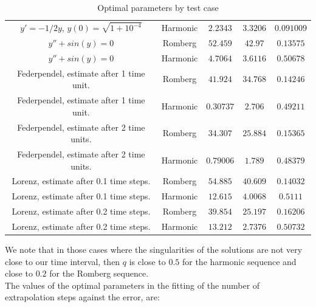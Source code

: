 \begin{table}[H]
\begin{tabular}{c|c||c|c|c}
$y' = -1/2y$, $y(0) = \sqrt{1+10^{-4}}$ & Harmonic & \(2.2343\) & \(3.3206\) & \(0.091009\)\\
$y'' + sin(y) = 0$ & Romberg & \(52.459\) & \(42.97\) & \(0.13575\)\\
$y'' + sin(y) = 0$ & Harmonic & \(4.7064\) & \(3.6116\) & \(0.50678\)\\
Federpendel, estimate after 1 time unit. & Romberg & \(41.924\) & \(34.768\) & \(0.14246\)\\
Federpendel, estimate after 1 time unit. & Harmonic & \(0.30737\) & \(2.706\) & \(0.49211\)\\
Federpendel, estimate after 2 time units. & Romberg & \(34.307\) & \(25.884\) & \(0.15365\) \\
Federpendel, estimate after 2 time units. & Harmonic & \(0.79006\) & \(1.789\) & \(0.48379\) \\
Lorenz, estimate after 0.1 time steps. & Romberg & \(54.885\) & \(40.609\) & \(0.14032\)\\
Lorenz, estimate after 0.1 time steps. & Harmonic & \(12.615\) & \(4.0068\) & \(0.5111\) \\
Lorenz, estimate after 0.2 time steps. & Romberg & \(39.854\) & \(25.197\) & \(0.16206\)  \\
Lorenz, estimate after 0.2 time steps. & Harmonic & \(13.212\) & \(2.7376\) & \(0.50732\)\\
    \end{tabular}
    \caption{Optimal parameters by test case}
    \label{tab:my_label}
\end{table}

We note that in those cases where the singularities of the solutions are not very close to our time interval, then \(q\) is close to \(0.5\) for the harmonic sequence and close to \(0.2\) for the Romberg sequence.\\

The values of the optimal parameters in the fitting of the number of extrapolation steps against the error, are:

